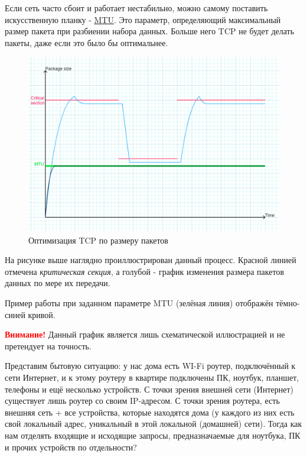 Если сеть часто сбоит и работает нестабильно, можно самому поставить искусственную планку - \href{https://ru.wikipedia.org/wiki/Maximum_transmission_unit}{MTU}. Это параметр, определяющий максимальный размер пакета при разбиении набора данных. Больше него TCP не будет делать пакеты, даже если это было бы оптимальнее.

\begin{figure}[h]
	\centering
	\includegraphics[scale=0.5]{9/09_01.png}
	\caption{Оптимизация TCP по размеру пакетов}
\end{figure}

На рисунке выше наглядно проиллюстрирован данный процесс. Красной линией отмечена \textit{критическая секция}, а голубой - график изменения размера пакетов данных по мере их передачи.

Пример работы при заданном параметре MTU (зелёная линия) отображён тёмно-синей кривой.

\textcolor{red}{\textbf{Внимание!}} Данный график является лишь схематической иллюстрацией и не претендует на точность.

\bigskip 
Представим бытовую ситуацию: у нас дома есть WI-Fi роутер, подключённый к сети Интернет, и к этому роутеру в квартире подключены ПК, ноутбук, планшет, телефоны и ещё несколько устройств. С точки зрения внешней сети (Интернет) существует лишь роутер со своим IP-адресом. С точки зрения роутера, есть внешняя сеть + все устройства, которые находятся дома (у каждого из них есть свой локальный адрес, уникальный в этой локальной (домашней) сети). Тогда как нам отделять входящие и исходящие запросы, предназначаемые для ноутбука, ПК и прочих устройств по отдельности?

